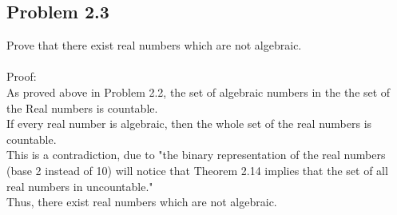 \subsection*{Problem 2.3}
Prove that there exist real numbers which are not algebraic. \\ 
\\
Proof:\\ 
As proved above in Problem 2.2, the set of algebraic numbers in the the set of the Real numbers is countable. \\ 
If every real number is algebraic, then the whole set of the real numbers is countable. \\
This is a contradiction, due to "the binary representation of the real numbers (base 2 instead of 10) will notice that Theorem 2.14 implies that the set of all real numbers in uncountable." \\
Thus, there exist real numbers which are not algebraic. 
\begin{figure}[ht]\end{figure} 
\\
\newpage
